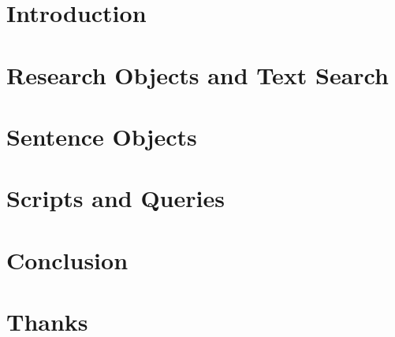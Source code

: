 \documentclass{beamer}
\begin{document}
\part{Introduction}








\part{Research Objects and Text Search}









\part{Sentence Objects}
























\part{Scripts and Queries}














\part{Conclusion}





\part{Thanks}

%
\end{document}
